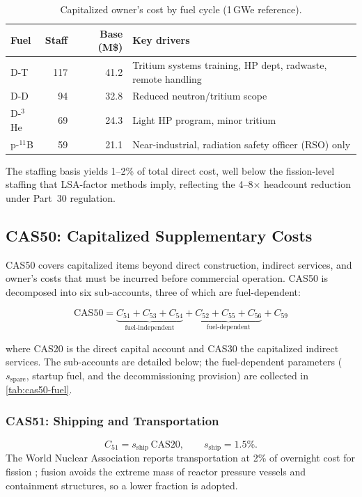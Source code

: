 \documentclass{article}
\begin{document}
\begin{table}[htbp]
\caption{Capitalized owner's cost by fuel cycle (1\,GWe reference).}
\label{tab:cas40-fuel}
\centering
\begin{tabular}{lrrl}
\toprule
Fuel & Staff & Base (M\$) & Key drivers \\
\midrule
D-T          & 117 & 41.2 & Tritium systems training, HP dept, radwaste, remote handling \\
D-D          &  94 & 32.8 & Reduced neutron/tritium scope \\
D-${}^3$He   &  69 & 24.3 & Light HP program, minor tritium \\
p-${}^{11}$B &  59 & 21.1 & Near-industrial, radiation safety officer (RSO) only \\
\bottomrule
\end{tabular}
\end{table}

The staffing basis yields 1--2\% of total direct cost, well below the
fission-level staffing that LSA-factor methods imply, reflecting the
4--8$\times$ headcount reduction under Part~30 regulation.


\subsection{CAS50: Capitalized Supplementary Costs}
\label{sec:cas50}

CAS50 covers capitalized items beyond direct construction, indirect
services, and owner's costs that must be incurred before commercial
operation. CAS50 is decomposed into six sub-accounts, three of which
are fuel-dependent:

\begin{equation}
\label{eq:cas50}
\text{CAS50} = \underbrace{C_{51} + C_{53} + C_{54}}_{\text{fuel-independent}}
             + \underbrace{C_{52} + C_{55} + C_{56}}_{\text{fuel-dependent}}
             + C_{59}
\end{equation}

\noindent where CAS20 is the direct capital account and CAS30 the
capitalized indirect services. The sub-accounts are detailed below; the
fuel-dependent parameters ($s_{\text{spare}}$, startup fuel, and the
decommissioning provision) are collected in \cref{tab:cas50-fuel}.

\subsubsection{CAS51: Shipping and Transportation}
\begin{equation}
\label{eq:cas51}
C_{51} = s_{\text{ship}}\,\text{CAS20}, \qquad s_{\text{ship}} = 1.5\%.
\end{equation}
The World Nuclear Association reports transportation at 2\% of overnight
cost for fission \citep{wna2025}; fusion avoids the extreme mass of
reactor pressure vessels and containment structures, so a lower fraction
is adopted.
\end{document}
